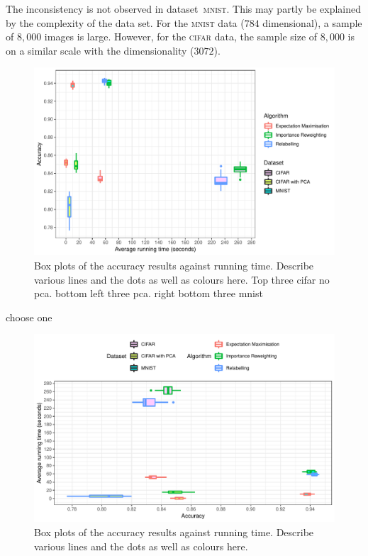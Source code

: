 \documentclass[12pt]{article} %
\begin{document}
The inconsistency is not observed in dataset~\textsc{mnist}. This may partly be explained by the complexity of the data set. For the \textsc{mnist} data ($784$ dimensional), a sample of $8,000$ images is large. However, for the \textsc{cifar} data, the sample size of $8,000$ is on a similar scale with the dimensionality ($3072$).
\begin{figure}
	\centering
    \includegraphics[scale=0.8]{boxplotv}%
	\caption{Box plots of the accuracy results against running time. {\color{red}Describe various lines and the dots as well as colours here. }
Top three cifar no pca. bottom left three pca. right bottom three mnist}
	\label{fig:Boxplot}
\end{figure}
choose one
\begin{figure}
	\centering
    \includegraphics[scale=0.8]{boxplot}%
	\caption{Box plots of the accuracy results against running time. {\color{red}Describe various lines and the dots as well as colours here. }
}
	\label{fig:Boxplot}
\end{figure}
\end{document}
